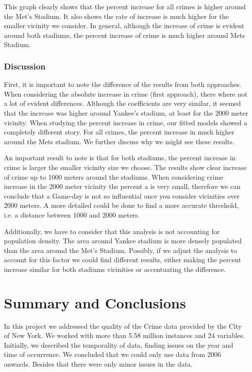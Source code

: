 \documentclass{article}
\begin{document}
This graph clearly shows that the percent increase for all crimes is higher around the Met's Stadium. It also shows the rate of increase is much higher for the smaller vicinity  we consider. In general, although the increase of crime is evident around both stadiums, the percent increase  of crime is much higher around Mets Stadium.

\subsubsection{Discussion}

First, it is important to note the difference of the results from both approaches. When considering the absolute increase in crime (first approach), there where not a lot of evident differences.  Although the coefficients are very similar, it seemed that the increase was higher around Yankee's stadium, at least for the 2000 meter vicinity. When studying the percent increase in crime, our fitted models showed a completely different story. For all crimes, the percent increase in much higher around the Mets stadium. We further discuss why we might see these results.

An important result to note is that for both stadiums, the percent increase in crime is larger the smaller vicinity size  we choose. The results show clear increase of crime up to 1000 meters around the stadiums. When considering crime increase in the  2000 meter vicinity the percent a is very small, therefore we can conclude that a Game-day is not so influential once you consider  vicinities over 2000 meters.  A more detailed could be done to find a more accurate threshold, i.e. a distance between 1000 and 2000 meters.

Additionally, we have to consider that this analysis is not accounting for population density. The area around Yankee stadium is more densely populated than the area around the Met's Stadium. Possibly, if we adjust the analysis to account for this factor we could find different results, either making the percent increase similar for both stadiums vicinities or accentuating the difference.


\pagebreak
\section{Summary and Conclusions}

In this project we addressed the quality of the Crime data provided  by the City of New York. We worked with more than 5.58 million instances and 24 variables. Initially, we described the temporality of data, finding issues on the year and time of occurrence. We concluded that we could only use data from 2006 onwards. Besides that there were only minor issues in the data.   
\end{document}
